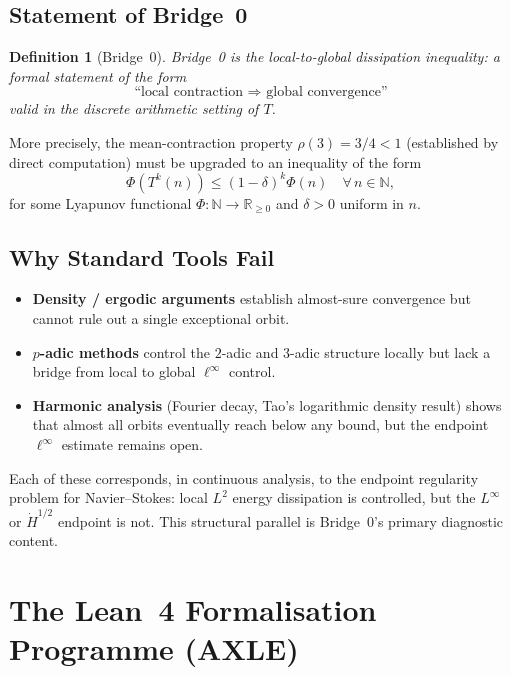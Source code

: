 \documentclass[11pt,a4paper]{article}
\newtheorem{definition}[theorem]{Definition}
\begin{document}
\subsection{Statement of Bridge~0}

\begin{definition}[Bridge~0]
\emph{Bridge~0} is the local-to-global dissipation inequality:
a formal statement of the form
\[
  \text{``local contraction } \Rightarrow \text{ global convergence''}
\]
valid in the discrete arithmetic setting of $T$.
\end{definition}

More precisely, the mean-contraction property $\rho(3) = 3/4 < 1$
(established by direct computation) must be upgraded to an inequality
of the form
\[
  \Phi(T^k(n)) \leq (1 - \delta)^k \Phi(n) \quad \forall\, n \in \mathbb{N},
\]
for some Lyapunov functional $\Phi : \mathbb{N} \to \mathbb{R}_{\geq 0}$
and $\delta > 0$ uniform in $n$.

\subsection{Why Standard Tools Fail}

\begin{itemize}
  \item \textbf{Density / ergodic arguments} establish almost-sure
        convergence but cannot rule out a single exceptional orbit.
  \item \textbf{$p$-adic methods} control the $2$-adic and $3$-adic
        structure locally but lack a bridge from local to global
        $\ell^\infty$ control.
  \item \textbf{Harmonic analysis} (Fourier decay, Tao's logarithmic
        density result) shows that almost all orbits eventually reach
        below any bound, but the endpoint $\ell^\infty$ estimate
        remains open.
\end{itemize}

Each of these corresponds, in continuous analysis, to the endpoint
regularity problem for Navier--Stokes: local $L^2$ energy dissipation
is controlled, but the $L^\infty$ or $\dot{H}^{1/2}$ endpoint is not.
This structural parallel is Bridge~0's primary diagnostic content.

\section{The Lean~4 Formalisation Programme (AXLE)}
\end{document}
